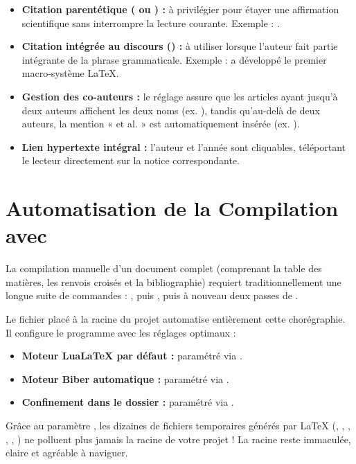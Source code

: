 \begin{itemize}
  \item \textbf{Citation parentétique ( ou ) :}
  à privilégier pour étayer une affirmation scientifique sans interrompre la lecture courante.
  Exemple : \autocite{knuth1984texbook}.
  \item \textbf{Citation intégrée au discours () :}
  à utiliser lorsque l'auteur fait partie intégrante de la phrase grammaticale.
  Exemple : \textcite{lamport1994latex} a développé le premier macro-système \LaTeX{}.
  \item \textbf{Gestion des co-auteurs :}
  le réglage  assure que les articles ayant jusqu'à deux auteurs
  affichent les deux noms (ex. \textcite{mittelbach2023latex}),
  tandis qu'au-delà de deux auteurs, la mention « et al. » est automatiquement insérée (ex. \textcite{lehman2024biblatex}).
  \item \textbf{Lien hypertexte intégral :}
  l'auteur et l'année sont cliquables, téléportant le lecteur directement sur la notice correspondante.
\end{itemize}

\section{Automatisation de la Compilation avec }
\label{sec:compilation-latexmkrc}

La compilation manuelle d'un document complet (comprenant la table des matières,
les renvois croisés et la bibliographie) requiert traditionnellement une longue suite de commandes :
, puis , puis à nouveau deux passes de .

Le fichier  placé à la racine du projet automatise entièrement cette chorégraphie.
Il configure le programme  avec les réglages optimaux :
\begin{itemize}
  \item \textbf{Moteur Lua\LaTeX{} par défaut :} paramétré via .
  \item \textbf{Moteur Biber automatique :} paramétré via .
  \item \textbf{Confinement dans le dossier  :} paramétré via .
\end{itemize}

\begin{callout}
Grâce au paramètre , les dizaines de fichiers temporaires générés par \LaTeX{}
(, , , , , )
ne polluent plus jamais la racine de votre projet !
La racine reste immaculée, claire et agréable à naviguer.
\end{callout}

